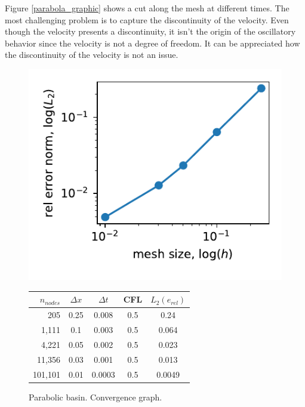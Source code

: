 Figure \ref{parabola_graphic} shows a cut along the mesh at different times. The most challenging problem is to capture the discontinuity of the velocity. Even though the velocity presents a discontinuity, it isn't the origin of the oscillatory behavior since the velocity is not a degree of freedom. It can be appreciated how the discontinuity of the velocity is not an issue.

\begin{figure}
\begin{minipage}{0.4\textwidth}
    \includegraphics[width=\textwidth]{img/eulerian/par/conv_1.pdf}
    \caption{Parabolic basin. Convergence graph.}
    \label{parabola_convergence}   
\end{minipage}
\hfill
\begin{minipage}{0.58\textwidth}
    \centering
    \begin{tabular}{>{\small}rcccc} \hline
    $n_{nodes}$ & $\Delta x$ & $\Delta t$ & CFL & $L_2(e_{rel})$ \\ \hline
205 & 0.25 & 0.008 & 0.5 & 0.24 \\
1,111 & 0.1 & 0.003 & 0.5 & 0.064 \\
4,221 & 0.05 & 0.002 & 0.5 & 0.023 \\
11,356 & 0.03 & 0.001 & 0.5 & 0.013 \\
101,101 & 0.01 & 0.0003 & 0.5 & 0.0049 \\
    \hline
    \end{tabular}
    \label{parabola_convergence_tab}
\end{minipage}
\end{figure}

